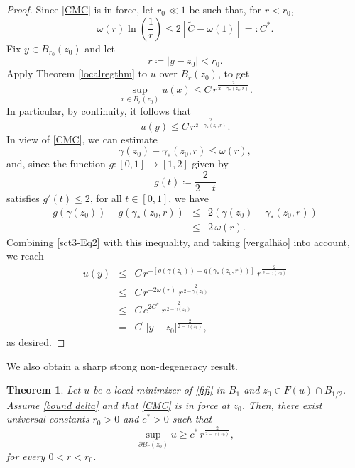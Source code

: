 \documentclass[reqno,11pt]{amsart}
\newtheorem{theorem}{Theorem}[section]
\newcommand{\1}{\mathds{1}}
\numberwithin{equation}{section}
\begin{document}
\begin{proof}
Since \eqref{CMC} is in force, let $r_0 \ll 1$ be such that, for $r< r_0$, 
\begin{equation}\label{vergalhão}
\omega(r) \ln \left( \frac{1}{r} \right ) \le 2 \left[ \tilde{C}-\omega(1)\right] =: C^\ast.
\end{equation}
Fix $y \in B_{r_0}(z_0)$ and let 
$$r\coloneqq |y-z_0| < r_0.$$
Apply Theorem \ref{localregthm} to $u$ over $B_{r}(z_0)$, to get
$$\sup_{x\in B_r(z_0)} u(x) \leq C\, r^{\frac{2}{2-\gamma_\ast(z_0,r)}}.$$
In particular, by continuity, it follows that
\begin{equation}\label{sct3-Eq2}
	u(y) \leq C \, r^{\frac{2}{2-\gamma_\ast(z_0,r)}}.
\end{equation}
In view of \eqref{CMC}, we can estimate
$$\gamma(z_0) - \gamma_\ast(z_0,r) \le \omega(r),$$ 
and, since the function $g\colon [0,1] \to [1,2]$ given by
$$
	g(t) \coloneqq  \frac{2}{2-t}
$$
satisfies $g'(t) \le 2$, for all $t\in [0,1]$, we have
\begin{eqnarray*}
		 g\left (\gamma(z_0) \right ) - g\left (\gamma_\ast(z_0,r) \right )  &\le& 2 \left (\gamma(z_0) - \gamma_\ast(z_0,r) \right ) \\
		&\le & 2\, \omega(r ).
\end{eqnarray*}
Combining \eqref{sct3-Eq2} with this inequality, and taking \eqref{vergalhão} into account, we reach 
\begin{eqnarray*}
		\displaystyle u(y) &\leq& \displaystyle C  \, r^{-\left [g\left (\gamma(z_0) \right ) - g\left (\gamma_\ast(z_0,r) \right ) \right ]}\, r^{\frac{2}{2-\gamma(z_0)}} \\
		&\le & C\, r^{-2\omega(r)} \, r^{\frac{2}{2-\gamma(z_0)}} \\
		&\le & C\, e^{2C^\ast} \, r^{\frac{2}{2-\gamma(z_0)}} \\
		&=& C^\prime \, |y-z_0|^{\frac{2}{2-\gamma(z_0)}},
\end{eqnarray*}
as desired.  
\end{proof}

We also obtain a sharp strong non-degeneracy result.

\begin{theorem}\label{sharp nondeg} Let $u$ be a local minimizer of \eqref{fifi} in $B_1$ and $z_0 \in F(u) \cap B_{1/2}$. Assume \eqref{bound delta} and that \eqref{CMC} is in force at $z_0$. Then, there exist universal constants $r_0>0$ and $c^\ast> 0$ such that
$$
	\sup_{\partial B_r(z_0)} u \geq c^\ast \, r^{\frac{2}{2-\gamma(z_0)}},
$$
for every $0<r < r_0$. 
\end{theorem}
\end{document}
